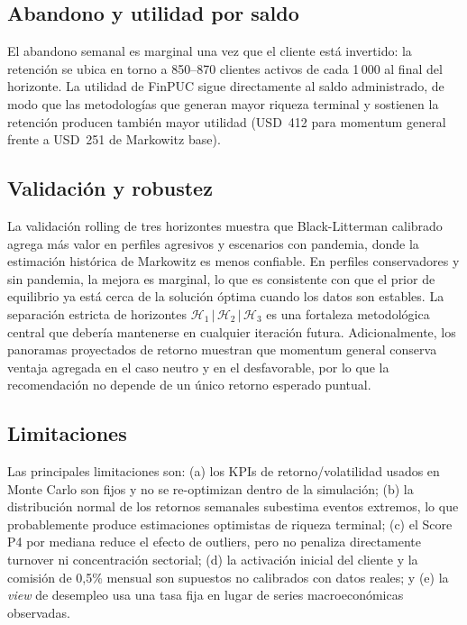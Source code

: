 \subsection{Abandono y utilidad por saldo}

El abandono semanal es marginal una vez que el cliente est\'a invertido: la
retenci\'on se ubica en torno a 850--870 clientes activos de cada 1\,000 al final
del horizonte. La utilidad de FinPUC sigue directamente al saldo administrado, de
modo que las metodolog\'ias que generan mayor riqueza terminal y sostienen la
retenci\'on producen tambi\'en mayor utilidad (USD~412 para momentum general
frente a USD~251 de Markowitz base).

\subsection{Validaci\'on y robustez}

La validaci\'on rolling de tres horizontes muestra que Black-Litterman calibrado
agrega m\'as valor en perfiles agresivos y escenarios con pandemia, donde la
estimaci\'on hist\'orica de Markowitz es menos confiable. En perfiles
conservadores y sin pandemia, la mejora es marginal, lo que es consistente con
que el prior de equilibrio ya est\'a cerca de la soluci\'on \'optima cuando los
datos son estables. La separaci\'on estricta de horizontes
$\mathcal{H}_1\,|\,\mathcal{H}_2\,|\,\mathcal{H}_3$ es una fortaleza
metodol\'ogica central que deber\'ia mantenerse en cualquier iteraci\'on futura.
Adicionalmente, los panoramas proyectados de retorno muestran que momentum
general conserva ventaja agregada en el caso neutro y en el desfavorable, por lo
que la recomendaci\'on no depende de un \'unico retorno esperado puntual.

\subsection{Limitaciones}

Las principales limitaciones son: (a) los KPIs de retorno/volatilidad usados en
Monte Carlo son fijos y no se re-optimizan dentro de la simulaci\'on; (b) la
distribuci\'on normal de los retornos semanales subestima eventos extremos, lo
que probablemente produce estimaciones optimistas de riqueza terminal; (c) el
Score P4 por mediana reduce el efecto de outliers, pero no penaliza
directamente turnover ni concentraci\'on sectorial; (d) la activaci\'on inicial
del cliente y la comisi\'on de 0,5\% mensual son supuestos no calibrados con
datos reales; y (e) la \textit{view} de desempleo usa una tasa fija en lugar de
series macroecon\'omicas observadas.

